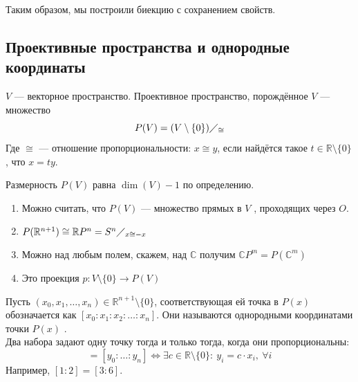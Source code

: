 \documentclass[11pt]{article}
\begin{document}
    \begin{remark}
        Таким образом, мы построили биекцию с сохранением свойств.
    \end{remark}
    \subsection{Проективные пространства и однородные координаты}
    \begin{definition}
        $V$ --- векторное пространство. Проективное пространство, порождённое $V$ --- множество
        \begin{equation*}
            P(V) = (V \setminus \{0\}) \diagup_{\cong}
        \end{equation*}
        Где $\cong$ --- отношение пропорциональности: $x \cong y$, если найдётся такое $t \in \mathbb{R} \setminus \{0\}$, что $x = ty$.
    \end{definition}

    \begin{remark}
        Размерность $P(V)$ равна $\dim(V) - 1$ по определению.
    \end{remark}

    \begin{remark}
        \begin{enumerate}
            \item Можно считать, что $P(V)$ --- множество прямых в $V$ , проходящих через $O$.
            \item $P(\mathbb{R}^{n + 1}) \cong \mathbb{R}P^{n} = S^n \diagup_{x \cong -x}$
            \item Можно над любым полем, скажем, над $\mathbb{C}$ получим $\mathbb{C}P^m = P(\mathbb{C}^m)$
            \item Это проекция $p: V \setminus \{0\} \to P(V)$
        \end{enumerate}
    \end{remark}


    Пусть $(x_0, x_1, \hdots, x_n) \in \mathbb{R}^{n+1} \setminus \{0\}$, соответствующая ей точка в $P(x)$ обозначается как $[x_0 : x_1 : x_2 : \hdots : x_n]$. Они называются однородными координатами точки $P(x)$
. \\

    Два набора задают одну точку тогда и только тогда, когда они пропорциональны:
    \begin{equation*}
        [x_0 : \hdots : x_n] = [y_0 : \hdots : y_n] \Longleftrightarrow \exists c \in \mathbb{R} \setminus \{0\}: \ y_i = c \cdot x_i, \ \forall i
    \end{equation*}
    Например, $[1 : 2] = [3 : 6]$.
\end{document}
